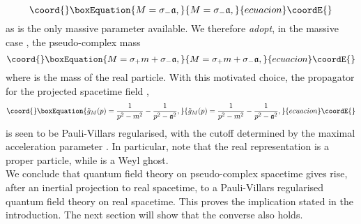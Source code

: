 \documentclass[a4paper,aps,prd,showkeys,showpacs,superscriptaddress,preprint]{revtex4}
\providecommand{\pc}{\mathbb{P}}
\begin{document}
\begin{equation}\coord{}\boxEquation{
  M = \sigma_- \mathfrak{a},
}{
  M = \sigma_- \mathfrak{a},
}{ecuacion}\coordE{}\end{equation} 
as \coordHE{} is the only massive parameter available. We therefore \textsl{adopt}, in the massive case
\myHighlight{$M\not\in\pc^0$}\coordHE{}, the pseudo-complex mass
\begin{equation}\coord{}\boxEquation{
  M = \sigma_+ m + \sigma_- \mathfrak{a},
}{
  M = \sigma_+ m + \sigma_- \mathfrak{a},
}{ecuacion}\coordE{}\end{equation}
where \coordHE{} is the mass of the real \myHighlight{$\phi_+$}\coordHE{} particle. With this
motivated choice, the propagator
for the projected spacetime field \myHighlight{$\varphi$}\coordHE{},
\begin{equation}\coord{}\boxEquation{
  \tilde g_M(p) = \frac{1}{p^2-m^2} - \frac{1}{p^2-\mathfrak{a}^2},
}{
  \tilde g_M(p) = \frac{1}{p^2-m^2} - \frac{1}{p^2-\mathfrak{a}^2},
}{ecuacion}\coordE{}\end{equation}
is seen to be Pauli-Villars regularised, with the cutoff determined by
the maximal acceleration parameter \coordHE{}. In particular, note 
that the real representation \coordHE{} is a proper particle, 
while \coordHE{} is a Weyl ghost.\\

We conclude that quantum field theory on pseudo-complex spacetime
gives rise, after an inertial projection to real spacetime, to a
Pauli-Villars regularised quantum field theory on real spacetime. This
proves the implication \coordHE{} stated in the
introduction. The next section will show that the converse also holds. 
\end{document}
